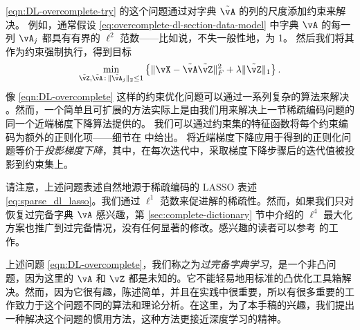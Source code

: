 \documentclass[../../book-main_zh.tex]{subfiles}
\begin{document}
\eqref{eqn:DL-overcomplete-try} 的这个问题通过对字典 $\tilde{\vA}$ 的列的尺度添加约束来解决。
例如，通常假设 \eqref{eq:overcomplete-dl-section-data-model} 中字典 $\vA$ 的每一列 $\vA_j$ 都具有有界的 $\ell^2$ 范数——比如说，不失一般性地，为 1。
然后我们将其作为约束强制执行，得到目标
\begin{equation}
    \min_{\tilde{\vZ}, \tilde{\vA} \,:\, \norm{\tilde{\vA}_j}_2 \leq 1}
    \bc{\norm{\vX - \tilde{\vA}\tilde{\vZ}}_{F}^{2} + \lambda \norm{\tilde{\vZ}}_{1}}.
    \label{eqn:DL-overcomplete}
\end{equation}
像 \eqref{eqn:DL-overcomplete} 这样的约束优化问题可以通过一系列复杂的算法来解决 \cite{nocedal2006numerical}。然而，一个简单且可扩展的方法实际上是由我们用来解决上一节稀疏编码问题的同一个近端梯度下降算法提供的。
我们可以通过约束集的特征函数将每个约束编码为额外的正则化项——细节在  中给出。
将近端梯度下降应用于得到的正则化问题等价于\textit{投影梯度下降}，其中，在每次迭代中，采取梯度下降步骤后的迭代值被投影到约束集上。

\begin{remark}
请注意，上述问题表述自然地源于稀疏编码的 LASSO 表述 \eqref{eq:sparse_dl_lasso}。我们通过 \(\ell^1\) 范数来促进解的稀疏性。然而，如果我们只对恢复过完备字典 \(\vA\) 感兴趣，第 \ref{sec:complete-dictionary} 节中介绍的 \(\ell^4\) 最大化方案也推广到过完备情况，没有任何显著的修改。感兴趣的读者可以参考 \cite{Qu2020Geometric} 的工作。
\end{remark}

上述问题 \eqref{eqn:DL-overcomplete}，我们称之为\textit{过完备字典学习}，是一个非凸问题，因为这里的 \(\vA\) 和 \(\vZ\) 都是未知的。它不能轻易地用标准的凸优化工具箱解决。然而，因为它很有趣，陈述简单，并且在实践中很重要，所以有很多重要的工作致力于这个问题不同的算法和理论分析。在这里，为了本手稿的兴趣，我们提出一种解决这个问题的惯用方法，这种方法更接近深度学习的精神。
\end{document}
